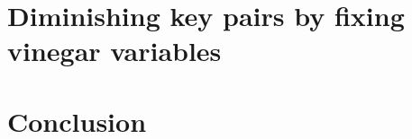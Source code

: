 \documentclass{ufsctex/ufsctex}
\begin{document}





\chapter{Diminishing key pairs by fixing vinegar variables}

\chapter{Conclusion}



\end{document}
